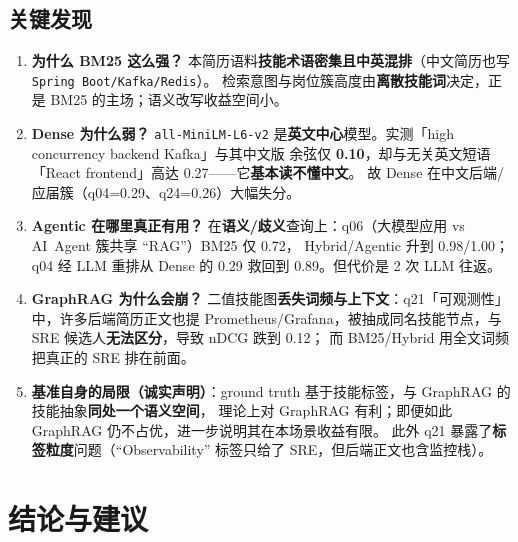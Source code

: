 \documentclass[11pt,a4paper,fontset=windows]{ctexart}
\begin{document}
\subsection{关键发现}
\label{sec:findings}
\begin{enumerate}
\item \textbf{为什么 BM25 这么强？} 本简历语料\textbf{技能术语密集且中英混排}（中文简历也写 \texttt{Spring Boot/Kafka/Redis}）。
      检索意图与岗位簇高度由\textbf{离散技能词}决定，正是 BM25 的主场；语义改写收益空间小。
\item \textbf{Dense 为什么弱？} \texttt{all-MiniLM-L6-v2} 是\textbf{英文中心}模型。实测「high concurrency backend Kafka」与其中文版
      余弦仅 \textbf{0.10}，却与无关英文短语「React frontend」高达 0.27——它\textbf{基本读不懂中文}。
      故 Dense 在中文后端/应届簇（q04=0.29、q24=0.26）大幅失分。
\item \textbf{Agentic 在哪里真正有用？} 在\textbf{语义/歧义}查询上：q06（大模型应用 vs AI~Agent 簇共享 “RAG”）BM25 仅 0.72，
      Hybrid/Agentic 升到 0.98/1.00；q04 经 LLM 重排从 Dense 的 0.29 救回到 0.89。但代价是 2 次 LLM 往返。
\item \textbf{GraphRAG 为什么会崩？} 二值技能图\textbf{丢失词频与上下文}：q21「可观测性」中，许多后端简历正文也提
      Prometheus/Grafana，被抽成同名技能节点，与 SRE 候选人\textbf{无法区分}，导致 nDCG 跌到 0.12；
      而 BM25/Hybrid 用全文词频把真正的 SRE 排在前面。
\item \textbf{基准自身的局限（诚实声明）}：ground truth 基于技能标签，与 GraphRAG 的技能抽象\textbf{同处一个语义空间}，
      理论上对 GraphRAG 有利；即便如此 GraphRAG 仍不占优，进一步说明其在本场景收益有限。
      此外 q21 暴露了\textbf{标签粒度}问题（“Observability” 标签只给了 SRE，但后端正文也含监控栈）。
\end{enumerate}

\section{结论与建议}
\label{sec:conclusion}
\end{document}
